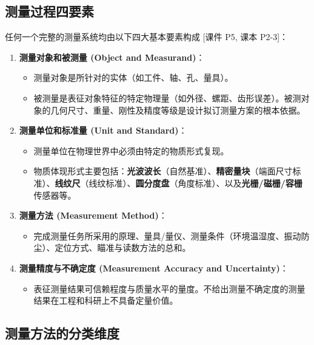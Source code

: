 \documentclass[11pt,a4paper]{ctexart}
\begin{document}
\subsection{测量过程四要素}
任何一个完整的测量系统均由以下四大基本要素构成 \hfill\textsf{[课件 P5, 课本 P2-3]}：
\begin{enumerate}[leftmargin=1.5em, itemsep=4pt]
    \item \textbf{测量对象和被测量 (Object and Measurand)}：
    \begin{itemize}
        \item 测量对象是所针对的实体（如工件、轴、孔、量具）。
        \item 被测量是表征对象特征的特定物理量（如外径、螺距、齿形误差）。被测对象的几何尺寸、重量、刚性及精度等级是设计拟订测量方案的根本依据。
    \end{itemize}
    \item \textbf{测量单位和标准量 (Unit and Standard)}：
    \begin{itemize}
        \item 测量单位在物理世界中必须由特定的物质形式复现。
        \item 物质体现形式主要包括：\textbf{光波波长}（自然基准）、\textbf{精密量块}（端面尺寸标准）、\textbf{线纹尺}（线纹标准）、\textbf{圆分度盘}（角度标准）、以及\textbf{光栅/磁栅/容栅}传感器等。
    \end{itemize}
    \item \textbf{测量方法 (Measurement Method)}：
    \begin{itemize}
        \item 完成测量任务所采用的原理、量具/量仪、测量条件（环境温湿度、振动防尘）、定位方式、瞄准与读数方法的总和。
    \end{itemize}
    \item \textbf{测量精度与不确定度 (Measurement Accuracy and Uncertainty)}：
    \begin{itemize}
        \item 表征测量结果可信赖程度与质量水平的量度。不给出测量不确定度的测量结果在工程和科研上不具备定量价值。
    \end{itemize}
\end{enumerate}

\subsection{测量方法的分类维度}
\end{document}
